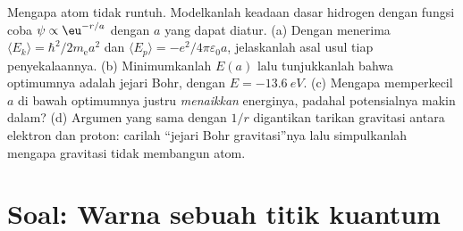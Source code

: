 \begin{exercise}[$\star\star\star$]\label{exo:b3:schrodinger-three-dimensions:12}
Mengapa atom tidak runtuh. Modelkanlah keadaan dasar hidrogen dengan
fungsi coba $\psi \propto \eu^{-r/a}$ dengan $a$ yang dapat diatur. (a)
Dengan menerima $\langle E_k\rangle = \hbar^2/2m_{\text{e}}a^2$ dan
$\langle E_p\rangle = -e^2/4\pi\varepsilon_0a$, jelaskanlah asal usul
tiap penyekalaannya. (b) Minimumkanlah $E(a)$ lalu tunjukkanlah bahwa
optimumnya adalah jejari Bohr, dengan $E = \qty{-13.6}{eV}$. (c) Mengapa
memperkecil $a$ di bawah optimumnya justru \emph{menaikkan} energinya,
padahal potensialnya makin dalam? (d) Argumen yang sama dengan $1/r$
digantikan tarikan gravitasi antara elektron dan proton: carilah
``jejari Bohr gravitasi''nya lalu simpulkanlah mengapa gravitasi tidak
membangun atom.
\end{exercise}

\section{Soal: Warna sebuah titik kuantum}

